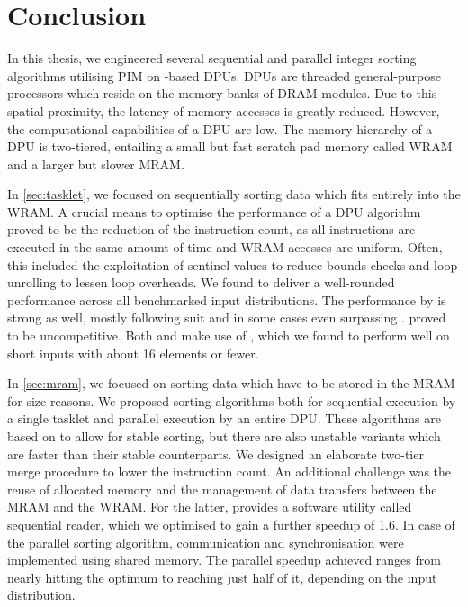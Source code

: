 \chapter{Conclusion}
\label{sec:conclusion}

In this thesis, we engineered several sequential and parallel integer sorting algorithms utilising \acf{PIM} on \upmem{}-based \acfp{DPU}.
\Acp{DPU} are threaded general-purpose processors which reside on the memory banks of \acs{DRAM} modules.
Due to this spatial proximity, the latency of memory accesses is greatly reduced.
However, the computational capabilities of a \ac{DPU} are low.
The memory hierarchy of a \ac{DPU} is two-tiered, entailing a small but fast scratch pad memory called \acf{WRAM} and a larger but slower \acf{MRAM}.

In \cref{sec:tasklet}, we focused on sequentially sorting data which fits entirely into the \ac{WRAM}.
A crucial means to optimise the performance of a \ac{DPU} algorithm proved to be the reduction of the instruction count, as all instructions are executed in the same amount of time and \ac{WRAM} accesses are uniform.
Often, this included the exploitation of sentinel values to reduce bounds checks and loop unrolling to lessen loop overheads.
We found \QS{} to deliver a well-rounded performance across all benchmarked input distributions.
The performance by \MS{} is strong as well, mostly following suit and in some cases even surpassing \QS{}.
\HS{} proved to be uncompetitive.
Both \QS{} and \MS{} make use of \IS{}, which we found to perform well on short inputs with about 16 elements or fewer.

In \cref{sec:mram}, we focused on sorting data which have to be stored in the \ac{MRAM} for size reasons.
We proposed sorting algorithms both for sequential execution by a single tasklet and parallel execution by an entire \ac{DPU}.
These algorithms are based on \MS{} to allow for stable sorting, but there are also unstable variants which are faster than their stable counterparts.
We designed an elaborate two-tier merge procedure to lower the instruction count.
An additional challenge was the reuse of allocated memory and the management of data transfers between the \ac{MRAM} and the \ac{WRAM}.
For the latter, \upmem{} provides a software utility called sequential reader, which we optimised to gain a further speedup of \num{1.6}.
In case of the parallel sorting algorithm, communication and synchronisation were implemented using shared memory.
The parallel speedup achieved ranges from nearly hitting the optimum to reaching just half of it, depending on the input distribution.

